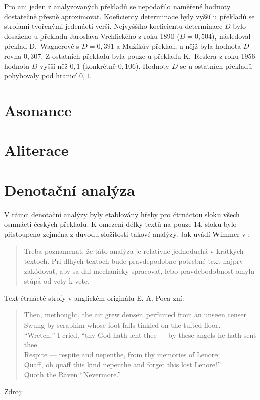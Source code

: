 \documentclass[dp.tex]{subfiles}
\begin{document}
Pro ani jeden z analyzovaných překladů se nepodařilo naměřené hodnoty dostatečně přesně aproximovat. Koeficienty determinace byly vyšší u překladů se strofami tvořenými jedenácti verši. Nejvyššího koeficientu determinace $D$ bylo dosaženo u překladu Jaroslava Vrchlického z roku 1890 ($D = 0,504$), následoval překlad D.~Wagnerové s $D = 0,391$ a Mužíkův překlad, u nějž byla hodnota $D$ rovna $0,307$. Z ostatních překladů byla pouze u překladu K.~Reslera z roku 1956 hodnota $D$ vyšší něž $0,1$ (konkrétně $0,106$). Hodnoty $D$ se u ostatních překladů pohybovaly pod hranicí $0,1$.

\section{Asonance}
\section{Aliterace}
\section{Denotační analýza}
\label{chap:denotation-analysis} 

V rámci denotační analýzy byly etablovány hřeby pro čtrnáctou sloku všech osmnácti českých překladů. K omezení délky textů na pouze 14. sloku bylo přistoupeno zejména z důvodu složitosti takové analýzy. Jak uvádí Wimmer v \cite[str.~300]{Wimmer2003}: 

\begin{quote}
Treba poznamenať, že táto analýza je relatívne jednoduchá v krátkých textoch. Pri dlhých textoch bude pravdepodobne potrebné text najprv zakódovať, aby sa dal mechanicky spracovať, lebo pravdebodobnosť omylu stúpá od vety k vete.
\end{quote}

Text čtrnácté strofy v anglickém originálu E. A. Poea zní:

\begin{verse}
 Then, methought, the air grew denser, perfumed from an unseen censer \\
 Swung by seraphim whose foot-falls tinkled on the tufted floor.\\
 “Wretch,” I cried, “thy God hath lent thee — by these angels he hath sent thee \\
 Respite — respite and nepenthe, from thy memories of Lenore; \\
 Quaff, oh quaff this kind nepenthe and forget this lost Lenore!”\\
 Quoth the Raven “Nevermore.” 
\end{verse}
\begin{flushright}
Zdroj: \cite[str.~65]{Poe1990}
\end{flushright}
\end{document}
